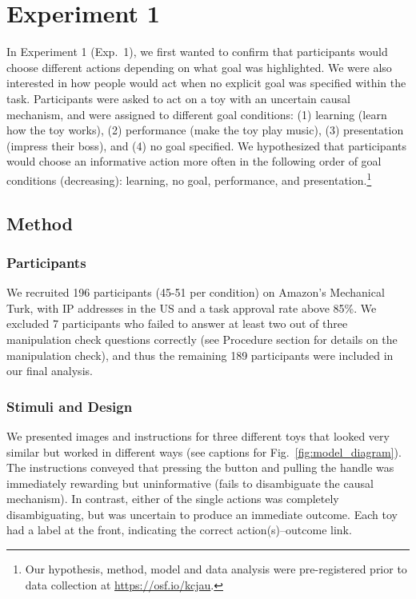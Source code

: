 \documentclass[10pt, letterpaper]{article}
\begin{document}
\section{Experiment 1}\label{experiment-1}

In Experiment 1 (Exp.~1), we first wanted to confirm that participants
would choose different actions depending on what goal was highlighted.
We were also interested in how people would act when no explicit goal
was specified within the task. Participants were asked to act on a toy
with an uncertain causal mechanism, and were assigned to different goal
conditions: (1) learning (learn how the toy works), (2) performance
(make the toy play music), (3) presentation (impress their boss), and
(4) no goal specified. We hypothesized that participants would choose an
informative action more often in the following order of goal conditions
(decreasing): learning, no goal, performance, and
presentation.\footnote{Our hypothesis, method, model and data analysis were pre-registered prior to data collection at \url{https://osf.io/kcjau}.}

\subsection{Method}\label{method}

\subsubsection{Participants}\label{participants}

We recruited 196 participants (45-51 per condition) on Amazon's
Mechanical Turk, with IP addresses in the US and a task approval rate
above 85\%. We excluded 7 participants who failed to answer at least two
out of three manipulation check questions correctly (see Procedure
section for details on the manipulation check), and thus the remaining
189 participants were included in our final analysis.

\subsubsection{Stimuli and Design}\label{stimuli-and-design}

We presented images and instructions for three different toys that
looked very similar but worked in different ways (see captions for
Fig.~\ref{fig:model_diagram}). The instructions conveyed that pressing
the button and pulling the handle was immediately rewarding but
uninformative (fails to disambiguate the causal mechanism). In contrast,
either of the single actions was completely disambiguating, but was
uncertain to produce an immediate outcome. Each toy had a label at the
front, indicating the correct action(s)--outcome link.
\end{document}
